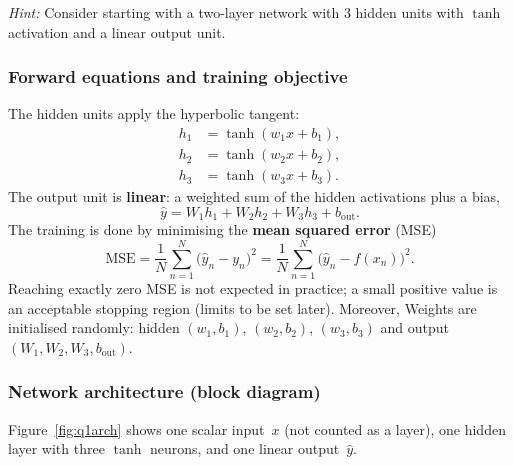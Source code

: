 \documentclass[12pt,a4paper]{article}
\begin{document}
\noindent\textit{Hint:} Consider starting with a two-layer network with 3 hidden
units with $\tanh$ activation and a linear output unit.

\subsubsection*{Forward equations and training objective}

The hidden units apply the hyperbolic tangent:
\begin{align}
  h_1 &= \tanh(w_1 x + b_1), \\
  h_2 &= \tanh(w_2 x + b_2), \\
  h_3 &= \tanh(w_3 x + b_3).
\end{align}
The output unit is \textbf{linear}: a weighted sum of the hidden activations
plus a bias,
\begin{equation}
  \hat{y}
    = W_1 h_1 + W_2 h_2 + W_3 h_3 + b_{\mathrm{out}}.
  \label{eq:q1out}
\end{equation}
 The training is done by minimising the \textbf{mean squared error} (MSE)
\begin{equation}
  \mathrm{MSE}
    = \frac{1}{N}\sum_{n=1}^{N}\bigl(\hat{y}_n - y_n\bigr)^{2}
    = \frac{1}{N}\sum_{n=1}^{N}\bigl(\hat{y}_n - f(x_n)\bigr)^{2}.
  \label{eq:q1mse}
\end{equation}
Reaching exactly zero MSE is not expected in practice; a small positive value
is an acceptable stopping region (limits to be set later). Moreover, Weights are initialised randomly:
hidden $(w_1,b_1)$, $(w_2,b_2)$, $(w_3,b_3)$ and output
$(W_1,W_2,W_3,b_{\mathrm{out}})$.

\subsubsection*{Network architecture (block diagram)}

Figure~\ref{fig:q1arch} shows one scalar input~$x$ (not counted as a layer),
one hidden layer with three $\tanh$ neurons, and one linear output~$\hat{y}$.
\end{document}
